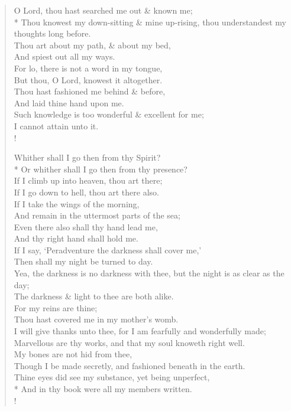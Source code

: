 \documentclass[MAIN]{subfiles}
\begin{document}
\begin{verse}
O Lord, thou hast searched me out \& known me;\\*
\vin Thou knowest my down-sitting \& mine up-rising, thou understandest my thoughts long before.\\
Thou art about my path, \& about my bed,\\
\vin And spiest out all my ways.\\
For lo, there is not a word in my tongue,\\
\vin But thou, O Lord, knowest it altogether.\\
Thou hast fashioned me behind \& before,\\
\vin And laid thine hand upon me.\\
Such knowledge is too wonderful \& excellent for me;\\
\vin I cannot attain unto it.\\!

Whither shall I go then from thy Spirit?\\*
\vin Or whither shall I go then from thy presence?\\
If I climb up into heaven, thou art there;\\
\vin If I go down to hell, thou art there also.\\
If I take the wings of the morning,\\
\vin And remain in the uttermost parts of the sea;\\
Even there also shall thy hand lead me,\\
\vin And thy right hand shall hold me.\\
If I say, `Peradventure the darkness shall cover me,'\\
\vin Then shall my night be turned to day.\\
Yea, the darkness is no darkness with thee, but the night is as clear as the day;\\
\vin The darkness \& light to thee are both alike.\\
For my reins are thine;\\
\vin Thou hast covered me in my mother's womb.\\
I will give thanks unto thee, for I am fearfully and wonderfully made;\\
\vin Marvellous are thy works, and that my soul knoweth right well.\\
My bones are not hid from thee,\\
\vin Though I be made secretly, and fashioned beneath in the earth.\\
Thine eyes did see my substance, yet being unperfect,\\*
\vin And in thy book were all my members written.\\!


\end{verse}
\end{document}
